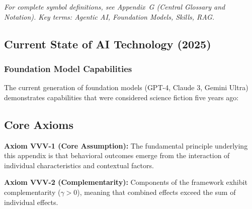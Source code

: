 
\noindent\textit{For complete symbol definitions, see Appendix~G (Central Glossary
and Notation). Key terms: Agentic AI, Foundation Models, Skills, RAG.}


\subsection{Current State of AI Technology (2025)}

\subsubsection{Foundation Model Capabilities}

The current generation of foundation models (GPT-4, Claude 3, Gemini Ultra)
demonstrates capabilities that were considered science fiction five years ago:

% 
\subsection{Core Axioms}
\label{sec:vvv-axioms}

\begin{tcolorbox}[colback=yellow!5!white,colframe=yellow!75!black,title=Axiom VVV-1: Fundamental Principle]
\textbf{Axiom VVV-1 (Core Assumption):}
The fundamental principle underlying this appendix is that behavioral outcomes
emerge from the interaction of individual characteristics and contextual factors.
\end{tcolorbox}

\begin{tcolorbox}[colback=yellow!5!white,colframe=yellow!75!black,title=Axiom VVV-2: Complementarity]
\textbf{Axiom VVV-2 (Complementarity):}
Components of the framework exhibit complementarity ($\gamma > 0$), meaning
that combined effects exceed the sum of individual effects.
\end{tcolorbox}


